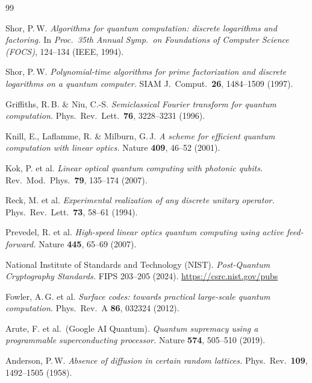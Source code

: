 \begin{thebibliography}{99}

Shor, P.\,W.
\textit{Algorithms for quantum computation: discrete logarithms and factoring.}
In \textit{Proc.\ 35th Annual Symp.\ on Foundations of Computer Science (FOCS)},
124--134 (IEEE, 1994).

Shor, P.\,W.
\textit{Polynomial-time algorithms for prime factorization and discrete
logarithms on a quantum computer.}
SIAM J.\ Comput.\ \textbf{26}, 1484--1509 (1997).

Griffiths, R.\,B. \& Niu, C.-S.
\textit{Semiclassical Fourier transform for quantum computation.}
Phys.\ Rev.\ Lett.\ \textbf{76}, 3228--3231 (1996).

Knill, E., Laflamme, R. \& Milburn, G.\,J.
\textit{A scheme for efficient quantum computation with linear optics.}
Nature \textbf{409}, 46--52 (2001).

Kok, P. et al.
\textit{Linear optical quantum computing with photonic qubits.}
Rev.\ Mod.\ Phys.\ \textbf{79}, 135--174 (2007).

Reck, M. et al.
\textit{Experimental realization of any discrete unitary operator.}
Phys.\ Rev.\ Lett.\ \textbf{73}, 58--61 (1994).

Prevedel, R. et al.
\textit{High-speed linear optics quantum computing using active feed-forward.}
Nature \textbf{445}, 65--69 (2007).

National Institute of Standards and Technology (NIST).
\textit{Post-Quantum Cryptography Standards.}
FIPS 203--205 (2024). \url{https://csrc.nist.gov/pubs}

Fowler, A.\,G. et al.
\textit{Surface codes: towards practical large-scale quantum computation.}
Phys.\ Rev.\ A \textbf{86}, 032324 (2012).

Arute, F. et al.\ (Google AI Quantum).
\textit{Quantum supremacy using a programmable superconducting processor.}
Nature \textbf{574}, 505--510 (2019).


Anderson, P.\,W.
\textit{Absence of diffusion in certain random lattices.}
Phys.\ Rev.\ \textbf{109}, 1492--1505 (1958).


\end{thebibliography}
